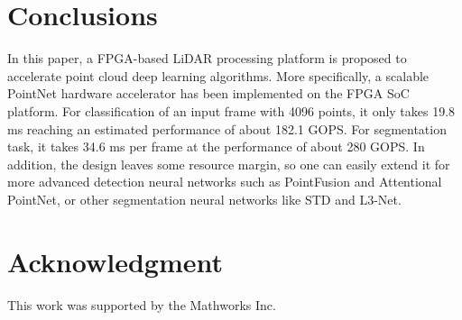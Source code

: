 \documentclass[conference]{IEEEtran}
\begin{document}
\section{Conclusions}\label{sec:conclude}
In this paper, a FPGA-based LiDAR processing platform is proposed to accelerate point cloud deep learning algorithms. More specifically, a scalable PointNet hardware accelerator has been implemented on the FPGA SoC platform. For classification of an input frame with 4096 points, it only takes 19.8 ms reaching an estimated performance of about 182.1 GOPS. For segmentation task, it takes 34.6 ms per frame at the performance of about 280 GOPS. In addition, the design leaves some resource margin, so one can easily extend it for more advanced detection neural networks such as PointFusion\cite{xu2018pointfusion} and Attentional PointNet\cite{paigwar2019attentional}, or other segmentation neural networks like STD\cite{yang2019std} and L3-Net\cite{lu2019l3}.

\begin{comment}
In our future work, the very first layer can be kept as floating-point operation using NEON floating and vector co-processors, which may improve the accuracy of the PointNet accelerator.
\end{comment}






\section*{Acknowledgment}
This work was supported by the Mathworks Inc.







%
%
%
\end{document}
